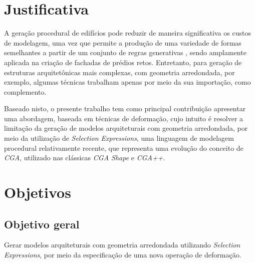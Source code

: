 \section{Justificativa}
\label{sec:justificativa}

A geração procedural de edifícios pode reduzir de maneira significativa os custos de modelagem, uma vez que permite a produção de uma variedade de formas semelhantes a partir de um conjunto de regras generativas \cite{smelik2014}, sendo amplamente aplicada na criação de fachadas de prédios retos. Entretanto, para geração de estruturas arquitetônicas mais complexas, com geometria arredondada, por exemplo, algumas técnicas trabalham apenas por meio da sua importação, como complemento.

Baseado nisto, o presente trabalho tem como principal contribuição apresentar uma abordagem, baseada em técnicas de deformação, cujo intuito é resolver a limitação da geração de modelos arquiteturais com geometria arredondada, por meio da utilização de \textit{Selection Expressions}, uma linguagem de modelagem procedural relativamente recente, que representa uma evolução do conceito de \textit{\gls{CGA}}, utilizado nas clássicas \textit{CGA Shape} e \textit{CGA++}.


\section{Objetivos}
\label{sec:objetivos}


\subsection{Objetivo geral}
\label{sec:objetivos_gerais}

Gerar modelos arquiteturais com geometria arredondada utilizando \textit{Selection Expressions}, por meio da especificação de uma nova operação de deformação.



